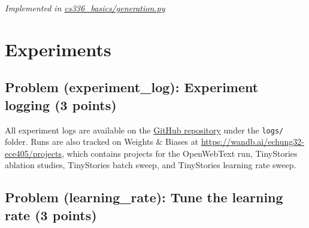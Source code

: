 \documentclass[letterpaper]{article}
\begin{document}
\textit{Implemented in  \href{https://github.com/echung32/ece405-assignment1-basics/blob/main/cs336_basics/generation.py}{cs336\_basics/generation.py}}

\section{Experiments}

\subsection{Problem (experiment\_log): Experiment logging (3 points)}

All experiment logs are available on the
\href{https://github.com/echung32/ece405-assignment1-basics/tree/main/logs}{GitHub repository}
under the \texttt{logs/} folder. Runs are also tracked on Weights \& Biases at
\url{https://wandb.ai/echung32-ece405/projects}, which contains projects for the
OpenWebText run, TinyStories ablation studies, TinyStories batch sweep, and TinyStories
learning rate sweep.

\subsection{Problem (learning\_rate): Tune the learning rate (3 points)}
\end{document}
